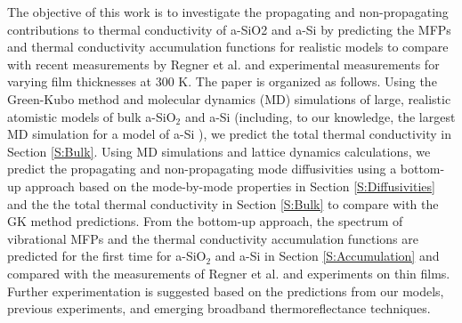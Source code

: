 \documentclass[aps,prb,twocolumn,superscriptaddress,footinbib,amsmath,amssymb,floatfix]{revtex4}
\begin{document}
The objective of this work is to investigate the propagating 
and non-propagating contributions to thermal conductivity of 
a-SiO2 and a-Si 
by predicting the MFPs and thermal conductivity 
accumulation functions for realistic models to 
compare with recent measurements by Regner et al.
\cite{regner_broadband_2013} and experimental measurements 
for varying film thicknesses at 300 K.
\cite{freeman_thermal_1986,graebner_phonon_1986,
cahill_lattice_1988,cahill_thermal_1989,
love_estimate_1990,cahill_thermal_1994,lee_heat_1997,
yamane_measurement_2002,baldi_thermal_2008,
liu_high_2009,yang_anomalously_2010} The paper is organized as follows. 
Using the Green-Kubo method and 
molecular dynamics (MD) simulations of large, realistic atomistic models 
of bulk a-SiO$_2$ and a-Si (including, to our 
knowledge, the largest MD simulation for a model of a-Si
\cite{barkema_high-quality_2000,he_heat_2011}), 
we predict the total thermal conductivity in Section \ref{S:Bulk}. 
Using MD simulations and lattice dynamics calculations, 
we predict the propagating and non-propagating mode 
diffusivities using a bottom-up approach 
based on the mode-by-mode properties in Section \ref{S:Diffusivities} and 
the the total thermal conductivity in Section \ref{S:Bulk} to compare with 
the GK method predictions. 
From the bottom-up approach, the spectrum of vibrational MFPs and 
the thermal conductivity accumulation functions 
are predicted for the first time 
for a-SiO$_2$ and a-Si in Section \ref{S:Accumulation} and 
compared with the measurements of  
Regner et al.\cite{regner_broadband_2013} and experiments on 
thin films.\cite{freeman_thermal_1986,graebner_phonon_1986,
cahill_lattice_1988,cahill_thermal_1989,
love_estimate_1990,cahill_thermal_1994,lee_heat_1997,
yamane_measurement_2002,baldi_thermal_2008,
liu_high_2009,yang_anomalously_2010} 
Further experimentation 
is suggested based on the predictions from our models, previous 
experiments,
\cite{freeman_thermal_1986,graebner_phonon_1986,
cahill_lattice_1988,cahill_thermal_1989,
love_estimate_1990,cahill_thermal_1994,lee_heat_1997,
yamane_measurement_2002,baldi_thermal_2008,
liu_high_2009,yang_anomalously_2010}
and emerging broadband thermoreflectance techniques.
\cite{koh_frequency_2007,minnich_thermal_2011,regner_broadband_2013,
yang_mean_2013}
\end{document}
